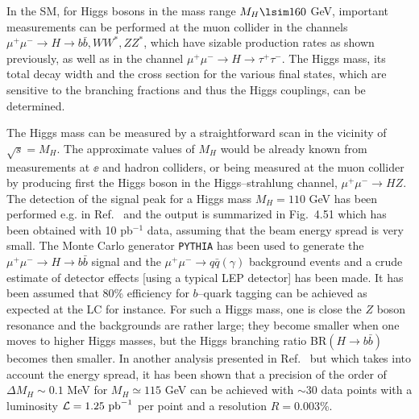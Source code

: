 In the SM, for Higgs bosons in the mass range $M_H \lsim 160$ GeV, important
measurements can be  performed at the muon collider in the  channels $\mu^+
\mu^- \to H \to  b\bar{b}, WW^*,ZZ^*$,  which  have sizable production rates as
shown previously, as well as in the channel $\mu^+ \mu^- \to H \to \tau^+
\tau^-$.   The Higgs mass, its total decay width and the cross section
for the various final states, which are sensitive to the branching fractions 
and thus the Higgs couplings, can be determined.\s

The Higgs mass can be measured by a straightforward scan in the vicinity
of $\sqrt{s}= M_H$.  The approximate values of $M_H$  would be already known
from measurements at $\ee$ and hadron colliders, or being measured at the muon
collider by producing  first the Higgs boson in the Higgs--strahlung channel,
$\mu^+ \mu^- \to HZ$.  The detection of the signal peak for a Higgs mass
$M_H=110$ GeV has been performed e.g. in Ref.~\cite{mu-Murray} and the output
is summarized in Fig.~4.51 which has been obtained with 10 pb$^{-1}$ data,
assuming that the beam energy spread is very small.  The Monte Carlo generator
{\tt PYTHIA} has been used to generate the $\mu^+\mu^- \to H \to b\bar b$ signal
and the $\mu^+ \mu^- \to q\bar q (\gamma)$ background events and a crude
estimate of detector effects [using a typical LEP detector] has been made. It
has been assumed that 80\% efficiency for $b$--quark tagging can be achieved
as expected at the LC for instance.  For such a Higgs mass, one is close the
$Z$ boson resonance and the backgrounds are rather large; they become smaller
when one moves to higher Higgs masses, but the Higgs branching ratio BR$(H\to 
b\bar b)$ becomes then smaller. In another analysis presented in
Ref.~\cite{mu-precision} but which takes into account the energy spread, it has
been shown that a precision of the order of $\Delta M_H \sim 0.1$ MeV for $M_H 
\simeq 115$ GeV can be achieved with $\sim 30$ data points with a luminosity 
${\cal L}=1.25~{\rm pb}^{-1}$ per point and a resolution $R=0.003$\%.\s

\begin{figure}[h]
\vspace*{-3mm}
\begin{center}
\end{center}
\vspace*{-2mm}
\vspace*{-2mm}
\end{figure}


